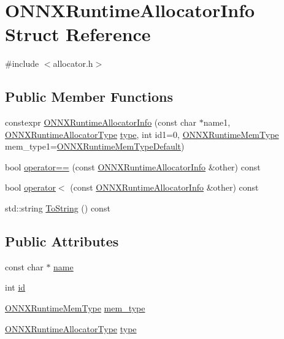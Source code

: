 \hypertarget{structONNXRuntimeAllocatorInfo}{}\section{O\+N\+N\+X\+Runtime\+Allocator\+Info Struct Reference}
\label{structONNXRuntimeAllocatorInfo}


{\ttfamily \#include $<$allocator.\+h$>$}

\subsection*{Public Member Functions}
\begin{DoxyCompactItemize}
\item 
constexpr \mbox{\hyperlink{structONNXRuntimeAllocatorInfo_a4ad9957df41db317499bf85b7ac145f7}{O\+N\+N\+X\+Runtime\+Allocator\+Info}} (const char $\ast$name1, \mbox{\hyperlink{allocator__info_8h_a2c2bd010ef8b74c81553f74c5eeb2677}{O\+N\+N\+X\+Runtime\+Allocator\+Type}} \mbox{\hyperlink{structONNXRuntimeAllocatorInfo_aa84751276c6e6a68d0dfc5d582c4b90d}{type}}, int id1=0, \mbox{\hyperlink{allocator__info_8h_add3f8ee3ff93395704abae71c30cab18}{O\+N\+N\+X\+Runtime\+Mem\+Type}} mem\+\_\+type1=\mbox{\hyperlink{allocator__info_8h_add3f8ee3ff93395704abae71c30cab18a232271cbf46c229ed40272a63af7a204}{O\+N\+N\+X\+Runtime\+Mem\+Type\+Default}})
\item 
bool \mbox{\hyperlink{structONNXRuntimeAllocatorInfo_a486b59b9a533151b5340b69e1df96259}{operator==}} (const \mbox{\hyperlink{structONNXRuntimeAllocatorInfo}{O\+N\+N\+X\+Runtime\+Allocator\+Info}} \&other) const
\item 
bool \mbox{\hyperlink{structONNXRuntimeAllocatorInfo_a4184adc46c4264b7520163792bdbe559}{operator$<$}} (const \mbox{\hyperlink{structONNXRuntimeAllocatorInfo}{O\+N\+N\+X\+Runtime\+Allocator\+Info}} \&other) const
\item 
std\+::string \mbox{\hyperlink{structONNXRuntimeAllocatorInfo_a642b7c00377a4d62f988ff0caddd828f}{To\+String}} () const
\end{DoxyCompactItemize}
\subsection*{Public Attributes}
\begin{DoxyCompactItemize}
\item 
const char $\ast$ \mbox{\hyperlink{structONNXRuntimeAllocatorInfo_af5027de8d87f680071513aa6fef2e68d}{name}}
\item 
int \mbox{\hyperlink{structONNXRuntimeAllocatorInfo_a013b0c7efc2a0800dafe014dcbd36600}{id}}
\item 
\mbox{\hyperlink{allocator__info_8h_add3f8ee3ff93395704abae71c30cab18}{O\+N\+N\+X\+Runtime\+Mem\+Type}} \mbox{\hyperlink{structONNXRuntimeAllocatorInfo_a9268102d6cd957a60f7331aa75ca6c0f}{mem\+\_\+type}}
\item 
\mbox{\hyperlink{allocator__info_8h_a2c2bd010ef8b74c81553f74c5eeb2677}{O\+N\+N\+X\+Runtime\+Allocator\+Type}} \mbox{\hyperlink{structONNXRuntimeAllocatorInfo_aa84751276c6e6a68d0dfc5d582c4b90d}{type}}
\end{DoxyCompactItemize}


